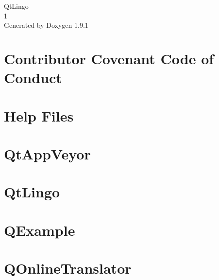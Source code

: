 \let\mypdfximage\pdfximage\def\pdfximage{\immediate\mypdfximage}\documentclass[twoside]{book}
\newcommand{\+}{\discretionary{\mbox{\scriptsize$\hookleftarrow$}}{}{}}
\newcommand{\clearemptydoublepage}{%
  \newpage{\pagestyle{empty}\cleardoublepage}%
}
\begin{document}
\raggedbottom

\hypersetup{pageanchor=false,
             bookmarksnumbered=true,
             pdfencoding=unicode
            }
\begin{titlepage}
\vspace*{7cm}
\begin{center}%
{\Large Qt\+Lingo \\[1ex]\large 1 }\\
\vspace*{1cm}
{\large Generated by Doxygen 1.9.1}\\
\end{center}
\end{titlepage}
\clearemptydoublepage
{}
\tableofcontents
\clearemptydoublepage
{}
\hypersetup{pageanchor=true}

\chapter{Contributor Covenant Code of Conduct}
\label{md_CODE_OF_CONDUCT}

\chapter{Help Files}
\label{md_help_ReadMe}

\chapter{Qt\+App\+Veyor}
\label{md_packages_com_appveyor_qtlingo_data_README}

\chapter{Qt\+Lingo}
\label{md_README}

\chapter{QExample}
\label{md_src_third_party_qonlinetranslator_docs_QExample}

\chapter{QOnline\+Translator}
\label{md_src_third_party_qonlinetranslator_docs_QOnlineTranslator}

\end{document}
